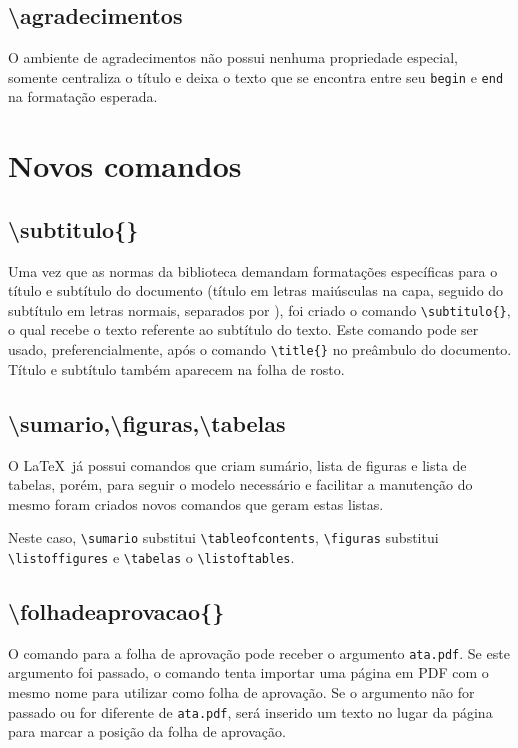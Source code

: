 \documentclass{fei}
\begin{document}
    \subsection{\textbackslash agradecimentos}
    O ambiente de agradecimentos não possui nenhuma propriedade especial, somente centraliza o título e deixa o texto que se encontra entre seu \texttt{begin} e \texttt{end} na formatação esperada.

\section{Novos comandos}
    
    \subsection{\textbackslash subtitulo\{\}}
    Uma vez que as normas da biblioteca demandam formatações específicas para o título e subtítulo do documento (título em letras maiúsculas na capa, seguido do subtítulo em letras normais, separados por \aspas{:}), foi criado o comando \verb+\subtitulo{}+, o qual recebe o texto referente ao subtítulo do texto. Este comando pode ser usado, preferencialmente, após o comando \verb+\title{}+ no preâmbulo do documento. Título e subtítulo também aparecem na folha de rosto.
    
    \subsection{\textbackslash sumario,\textbackslash figuras,\textbackslash tabelas}
    O \LaTeX~já possui comandos que criam sumário, lista de figuras e lista de tabelas, porém, para seguir o modelo necessário e facilitar a manutenção do mesmo foram criados novos comandos que geram estas listas.

    Neste caso, \verb+\sumario+ substitui \verb+\tableofcontents+, \verb+\figuras+ substitui \verb+\listoffigures+ e \verb+\tabelas+ o \verb+\listoftables+.

    \subsection{\textbackslash folhadeaprovacao\{\}}
    O comando para a folha de aprovação pode receber o argumento \texttt{ata.pdf}. Se este argumento foi passado, o comando tenta importar uma página em PDF com o mesmo nome para utilizar como folha de aprovação. Se o argumento não for passado ou for diferente de \texttt{ata.pdf}, será inserido um texto no lugar da página para marcar a posição da folha de aprovação.
\end{document}
